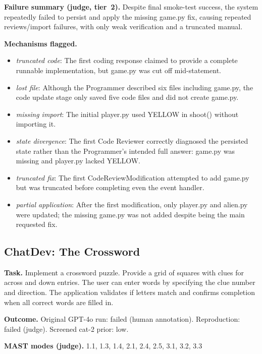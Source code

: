 \textbf{Failure summary (judge, tier~2).} Despite final smoke-test success, the system repeatedly failed to persist and apply the missing game.py fix, causing repeated reviews/import failures, with only weak verification and a truncated manual.

\textbf{Mechanisms flagged.}
\begin{itemize}
  \item \emph{truncated code}: The first coding response claimed to provide a complete runnable implementation, but game.py was cut off mid-statement.
  \item \emph{lost file}: Although the Programmer described six files including game.py, the code update stage only saved five code files and did not create game.py.
  \item \emph{missing import}: The initial player.py used YELLOW in shoot() without importing it.
  \item \emph{state divergence}: The first Code Reviewer correctly diagnosed the persisted state rather than the Programmer's intended full answer: game.py was missing and player.py lacked YELLOW.
  \item \emph{truncated fix}: The first CodeReviewModification attempted to add game.py but was truncated before completing even the event handler.
  \item \emph{partial application}: After the first modification, only player.py and alien.py were updated; the missing game.py was not added despite being the main requested fix.
\end{itemize}

\subsection*{ChatDev: The Crossword}
\textbf{Task.} Implement a crossword puzzle. Provide a grid of squares with clues for across and down entries. The user can enter words by specifying the clue number and direction. The application validates if letters match and confirms completion when all correct words are filled in.

\textbf{Outcome.} Original GPT-4o run: failed (human annotation). Reproduction: failed (judge). Screened cat-2 prior: low.

\textbf{MAST modes (judge).} 1.1, 1.3, 1.4, 2.1, 2.4, 2.5, 3.1, 3.2, 3.3

